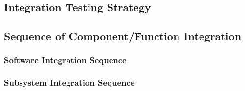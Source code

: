 \subsection{Integration Testing Strategy}

\subsection{Sequence of Component/Function Integration}

\subsubsection{Software Integration Sequence}

\subsubsection{Subsystem Integration Sequence}
